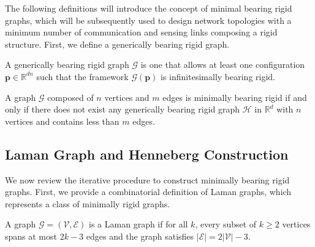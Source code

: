 The following definitions will introduce the concept of minimal bearing rigid graphs, which will be subsequently used to design network topologies with a minimum number of communication and sensing links composing a rigid structure. First, we define a generically bearing rigid graph. 
\begin{definition}
A generically bearing rigid graph $\mathcal{G}$ is one that allows at least one configuration $\mathbf{p}\in \mathbb{R}^{dn}$ such that the framework $\mathcal{G}(\mathbf{p})$ is infinitesimally bearing rigid.
\end{definition}
\begin{definition}
A graph $\mathcal{G}$ composed of $n$ vertices and $m$ edges is minimally bearing rigid if and only if there does not exist any generically bearing rigid graph $\mathcal{H}$ in $\mathbb{R}^d$ with $n$ vertices and contains less than $m$ edges.   
\end{definition}
\subsection{Laman Graph and Henneberg Construction}
\label{subsec:henneberg}
We now review the iterative procedure to construct minimally bearing rigid graphs. First, we provide a combinatorial definition of Laman graphs, which represents a class of minimally rigid graphs.
\begin{definition}
A graph $\mathcal{G} = (\mathcal{V}, \mathcal{E})$ is a Laman graph if for all $k$, every subset of $k\geq2$ vertices spans at most $2k-3$ edges and the graph satisfies $|\mathcal{E}| = 2|\mathcal{V}| - 3$.
\end{definition}

